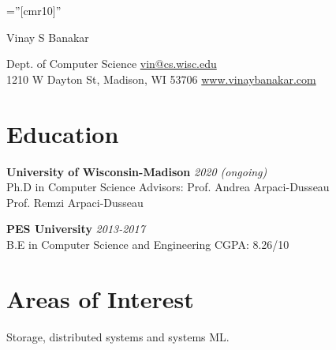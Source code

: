 \documentclass[a4paper,10pt]{article}
\begin{document}
\pagestyle{empty} %

\font\fb=''[cmr10]'' %


{\Huge Vinay S Banakar}

Dept. of Computer Science \hspace*{\fill} \href{mailto:vin@cs.wisc.edu}{vin@cs.wisc.edu}\\
1210 W Dayton St, Madison, WI 53706 \hspace*{\fill} \href{www.vinaybanakar.com}{www.vinaybanakar.com}

\vspace{5mm} %
\section{Education}
\textbf{University of Wisconsin-Madison}  \hspace*{\fill} \emph{2020 (ongoing)}\\
Ph.D in Computer Science \hspace*{\fill} Advisors: Prof. Andrea Arpaci-Dusseau \\\hspace*{\fill} Prof. Remzi Arpaci-Dusseau

\textbf{PES University} \hspace*{\fill} \emph{2013-2017} \\
B.E in Computer Science and Engineering \hspace*{\fill} CGPA: 8.26/10

\section{Areas of Interest}
Storage, distributed systems and systems ML.
\end{document}
